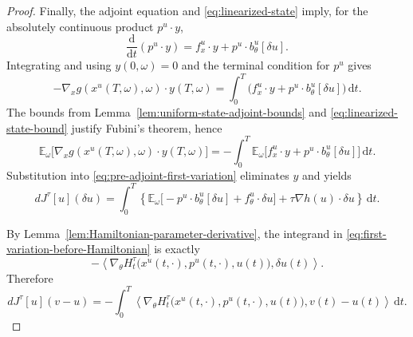 \documentclass[11pt]{amsart}
\numberwithin{equation}{section} %
\newcommand{\dd}{\mathrm{d}}
\theoremstyle{remark}
\begin{document}
\begin{proof}
Finally, the adjoint equation and \eqref{eq:linearized-state} imply,
for the absolutely continuous product $p^u\cdot y$,
\begin{equation}
\label{eq:adjoint-cancellation-pointwise}
\frac{\dd}{\dd t}(p^u\cdot y)
=f_x^u\cdot y+p^u\cdot b_\theta^u[\delta u].
\end{equation}
Integrating and using $y(0,\omega)=0$ and the terminal condition for
$p^u$ gives
\begin{equation}
\label{eq:adjoint-cancellation-integrated}
-\nabla_xg(x^u(T,\omega),\omega)\cdot y(T,\omega)
=\int_0^T\bigl(f_x^u\cdot y+p^u\cdot b_\theta^u[\delta u]\bigr)\,\dd t.
\end{equation}
The bounds from Lemma~\ref{lem:uniform-state-adjoint-bounds} and
\eqref{eq:linearized-state-bound} justify Fubini's theorem, hence
\begin{equation}
\label{eq:adjoint-cancellation-expected}
\mathbb E_\omega
\bigl[\nabla_xg(x^u(T,\omega),\omega)\cdot y(T,\omega)\bigr]
=-\int_0^T\mathbb E_\omega
\bigl[f_x^u\cdot y+p^u\cdot b_\theta^u[\delta u]\bigr]\,\dd t.
\end{equation}
Substitution into \eqref{eq:pre-adjoint-first-variation} eliminates
$y$ and yields
\begin{equation}
\label{eq:first-variation-before-Hamiltonian}
dJ^\tau[u](\delta u)
=\int_0^T\left\{\mathbb E_\omega
\bigl[-p^u\cdot b_\theta^u[\delta u]+f_\theta^u\cdot\delta u\bigr]
+\tau\nabla h(u)\cdot\delta u\right\}\,\dd t.
\end{equation}

By Lemma~\ref{lem:Hamiltonian-parameter-derivative},
the integrand in \eqref{eq:first-variation-before-Hamiltonian}
is exactly
\[
-\left\langle
\nabla_\theta H_t^\tau
\bigl(x^u(t,\cdot),p^u(t,\cdot),u(t)\bigr),
\delta u(t)
\right\rangle.
\]
Therefore
\[
dJ^\tau[u](v-u)
=
-\int_0^T
\left\langle
\nabla_\theta H_t^\tau
\bigl(x^u(t,\cdot),p^u(t,\cdot),u(t)\bigr),
v(t)-u(t)
\right\rangle
\,\dd t.
\]
\end{proof}




\end{document}

